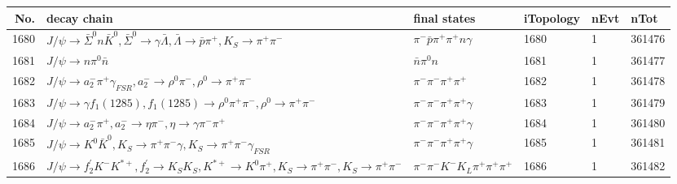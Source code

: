 \begin{table}[htbp] 
\begin{center}
\begin{small}
\begin{tabular}{rlllll}\hline\hline
 No. & decay chain & final states &  iTopology & nEvt & nTot \\\hline
1680&$J/\psi       \rightarrow \bar{\Sigma}^0   n                 \bar{K}^{0}   , \bar{\Sigma}^0    \rightarrow \gamma       \bar{\Lambda}    , \bar{\Lambda}     \rightarrow \bar{p}          \pi^{+}        , K_{S}           \rightarrow \pi^{+}        \pi^{-}        $&$\pi^{-}        \bar{p}          \pi^{+}        \pi^{+}        n                 \gamma       $& 1680&    1&361476\\
1681&$J/\psi       \rightarrow n                 \pi^{0}        \bar{n}          $&$\bar{n}          \pi^{0}        n                 $& 1681&    1&361477\\
1682&$J/\psi       \rightarrow a_{2}^{-}      \pi^{+}        \gamma_{FSR} , a_{2}^{-}       \rightarrow \rho^{0}      \pi^{-}        , \rho^{0}       \rightarrow \pi^{+}        \pi^{-}        $&$\pi^{-}        \pi^{-}        \pi^{+}        \pi^{+}        $& 1682&    1&361478\\
1683&$J/\psi       \rightarrow \gamma       f_{1}(1285)    , f_{1}(1285)     \rightarrow \rho^{0}      \pi^{+}        \pi^{-}        , \rho^{0}       \rightarrow \pi^{+}        \pi^{-}        $&$\pi^{-}        \pi^{-}        \pi^{+}        \pi^{+}        \gamma       $& 1683&    1&361479\\
1684&$J/\psi       \rightarrow a_{2}^{-}      \pi^{+}        , a_{2}^{-}       \rightarrow \eta          \pi^{-}        , \eta           \rightarrow \gamma       \pi^{-}        \pi^{+}        $&$\pi^{-}        \pi^{-}        \pi^{+}        \pi^{+}        \gamma       $& 1684&    1&361480\\
1685&$J/\psi       \rightarrow K^{0}          \bar{K}^{0}   , K_{S}           \rightarrow \pi^{+}        \pi^{-}        \gamma       , K_{S}           \rightarrow \pi^{+}        \pi^{-}        \gamma_{FSR} $&$\pi^{-}        \pi^{-}        \pi^{+}        \pi^{+}        \gamma       $& 1685&    1&361481\\
1686&$J/\psi       \rightarrow f_2^{'}       K^{-}          K^{*+}         , f_2^{'}        \rightarrow K_{S}          K_{S}          , K^{*+}          \rightarrow K^{0}          \pi^{+}        , K_{S}           \rightarrow \pi^{+}        \pi^{-}        , K_{S}           \rightarrow \pi^{+}        \pi^{-}        $&$\pi^{-}        \pi^{-}        K^{-}          K_{L}          \pi^{+}        \pi^{+}        \pi^{+}        $& 1686&    1&361482\\

\end{tabular}
\end{small}
\end{center}
\end{table}
